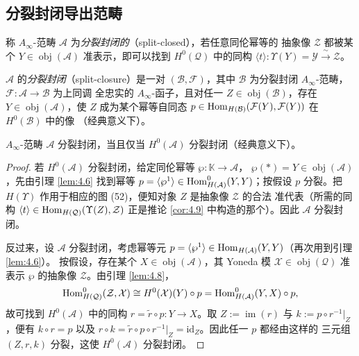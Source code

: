 \subsection{分裂封闭导出范畴}\label{sec:4.3}

\begin{Def}\label{def:4.10}
称 $A_\infty$-范畴 $\mathcal A$ 为\emph{分裂封闭的}（split-closed），若任意同伦幂等的
抽象像 $\mathcal Z$ 都被某个 $Y\in\operatorname{obj}(\mathcal A)$ 准表示，即可以找到
$H^0(\mathcal Q)$ 中的同构 $\langle t\rangle:\Upsilon(Y)=\mathcal Y\xrightarrow{\ \sim\ }
\mathcal Z$。

$\mathcal A$ 的\emph{分裂封闭}（split-closure）是一对 $(\mathcal B,\mathcal F)$，其中
$\mathcal B$ 为分裂封闭 $A_\infty$-范畴，$\mathcal F:\mathcal A\to\mathcal B$ 为上同调
全忠实的 $A_\infty$-函子，且对任一 $Z\in\operatorname{obj}(\mathcal B)$，存在
$Y\in\operatorname{obj}(\mathcal A)$，使 $Z$ 成为某个幂等自同态
$p\in\operatorname{Hom}_{H(\mathcal B)}(\mathcal F(Y),\mathcal F(Y))$ 在 $H^0(\mathcal B)$ 中的像
（经典意义下）。
\end{Def}

\begin{Lem}\label{lem:4.11}
$A_\infty$-范畴 $\mathcal A$ 分裂封闭，当且仅当 $H^0(\mathcal A)$ 分裂封闭（经典意义下）。
\end{Lem}

\begin{proof}
若 $H^0(\mathcal A)$ 分裂封闭，给定同伦幂等 $\wp:\mathbb K\to\mathcal A$，
$\wp(*)=Y\in\operatorname{obj}(\mathcal A)$，先由引理 \ref{lem:4.6} 找到幂等
$p=\langle\wp^1\rangle\in\operatorname{Hom}^0_{H(\mathcal A)}(Y,Y)$；按假设 $p$ 分裂。把
$H(\Upsilon)$ 作用于相应的图 (52)，便知对象 $Z$ 是抽象像 $\mathcal Z$ 的合法
准代表（所需的同构 $\langle t\rangle\in\operatorname{Hom}_{H(\mathcal Q)}(\Upsilon(Z),\mathcal Z)$
正是推论 \ref{cor:4.9} 中构造的那个）。因此 $\mathcal A$ 分裂封闭。

反过来，设 $\mathcal A$ 分裂封闭，考虑幂等元
$p=\langle\wp^1\rangle\in\operatorname{Hom}_{H(\mathcal A)}(Y,Y)$（再次用到引理 \ref{lem:4.6}）。
按假设，存在某个 $X\in\operatorname{obj}(\mathcal A)$，其 Yoneda 模
$\mathcal X\in\operatorname{obj}(\mathcal Q)$ 准表示 $\wp$ 的抽象像 $\mathcal Z$。由引理
\ref{lem:4.8}，
\[
  \operatorname{Hom}^0_{H(\mathcal Q)}(\mathcal Z,\mathcal X)
  \cong H^0(\mathcal X)(Y)\circ p
  =\operatorname{Hom}^0_{H(\mathcal A)}(Y,X)\circ p,
\]
故可找到 $H^0(\mathcal A)$ 中的同构 $r=\tilde r\circ p:Y\to X$。取
$Z:=\operatorname{im}(r)$ 与 $k:=p\circ r^{-1}|_Z$，便有 $k\circ r=p$ 以及
$r\circ k=\tilde r\circ p\circ r^{-1}|_Z=\mathrm{id}_Z$。因此任一 $p$ 都经由这样的
三元组 $(Z,r,k)$ 分裂，这使 $H^0(\mathcal A)$ 分裂封闭。
\end{proof}

